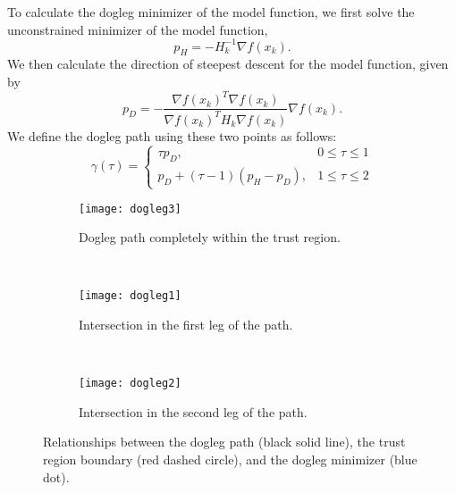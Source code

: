 To calculate the dogleg minimizer of the model function, we first solve the unconstrained minimizer of the model function,
\[
p_H = -H_k^{-1}\nabla f(x_k).
\]
We then calculate the direction of steepest descent for the model function, given by
\[
p_D = -\frac{\nabla f(x_k)^T\nabla f(x_k)}{\nabla f(x_k)^TH_k\nabla f(x_k)}\nabla f(x_k).
\]
We define the dogleg path using these two points as follows:
\[
\gamma(\tau) =  \left\{
     \begin{array}{lr}
       \tau p_D, & 0\leq \tau \leq 1\\
       p_D+(\tau-1)(p_H-p_D), & 1\leq \tau\leq 2
     \end{array}
   \right.
\]

\begin{figure}
\centering
    \begin{subfigure}[b]{0.3\textwidth}
            \texttt{[image: dogleg3]}
            \caption{Dogleg path completely within the trust region.}
            \label{fig:dl3}
    \end{subfigure}%
    ~ %
    \begin{subfigure}[b]{0.3\textwidth}
            \texttt{[image: dogleg1]}
            \caption{Intersection in the first leg of the path.}
            \label{fig:dl1}
    \end{subfigure}
    ~ %
    \begin{subfigure}[b]{0.3\textwidth}
            \texttt{[image: dogleg2]}
            \caption{Intersection in the second leg of the path.}
            \label{fig:dl2}
    \end{subfigure}
    \caption{Relationships between the dogleg path (black solid line),
    the trust region boundary (red dashed circle), and the dogleg minimizer (blue dot).}
    \label{fig:dogleg}
\end{figure}

